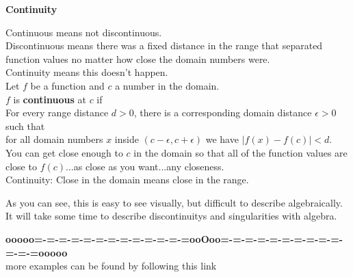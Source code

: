 \documentclass{ximera}
\begin{document}
\begin{idea} \textbf{Continuity}


Continuous means not discontinuous. \\

Discontinuous means there was a fixed distance in the range that separated function values no matter how close the domain numbers were. \\

Continuity means this doesn't happen. \\


Let $f$ be a function and $c$ a number in the domain. \\

$f$ is \textbf{continuous} at $c$ if  \\


For every range distance $d > 0 $, there is a corresponding domain distance $\epsilon > 0$ such that \\


for all domain numbers $x$ inside $(c - \epsilon, c + \epsilon)$ we have $| f(x) - f(c) | < d$. \\


You can get close enough to $c$ in the domain so that all of the function values are close to $f(c)$...as close as you want...any closeness. \\



Continuity: Close in the domain means close in the range.


\end{idea}


As you can see, this is easy to see visually, but difficult to describe algebraically.  It will take some time to describe discontinuitys and singularities with algebra.













\begin{center}
\textbf{\textcolor{green!50!black}{ooooo=-=-=-=-=-=-=-=-=-=-=-=-=ooOoo=-=-=-=-=-=-=-=-=-=-=-=-=ooooo}} \\

more examples can be found by following this link\\ 

\end{center}
\end{document}
